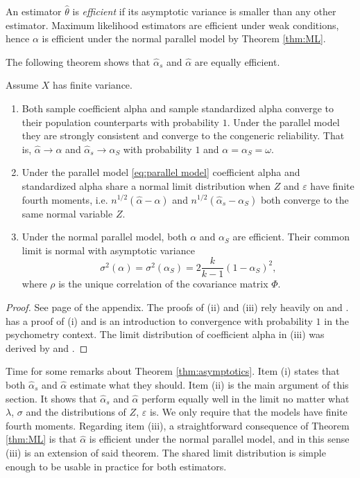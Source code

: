 \documentclass[twoside]{article}
\begin{document}
An estimator $\hat{\theta}$ is \textit{efficient} \citep[][Section 4.3]{Lehmann2004-ke} if its asymptotic variance is smaller than any other estimator. Maximum likelihood estimators are efficient under weak conditions, hence $\alpha$ is efficient under the normal parallel model by Theorem \ref{thm:ML}.  

The following theorem shows that $\hat{\alpha}_s$ and $\hat{\alpha}$ are equally efficient.

\begin{thm}
\label{thm:asymptotics}
Assume $X$ has finite variance. 
\begin{enumerate}[label=(\roman*)]
    \item Both sample coefficient alpha and sample standardized alpha converge to their population counterparts with probability $1$. Under the parallel model they are strongly consistent and converge to the congeneric reliability. That is, $\hat{\alpha}\to\alpha$ and $\hat{\alpha}_s\to\alpha_S$ with probability $1$ and $\alpha = \alpha_S = \omega$.
    \item Under the parallel model \eqref{eq:parallel model} coefficient alpha and standardized alpha share a normal limit distribution when $Z$ and $\varepsilon$ have finite fourth moments, i.e. $n^{1/2}(\hat{\alpha} - \alpha)$ and  $n^{1/2}(\hat{\alpha}_s - \alpha_S)$ both converge to the same normal variable $Z$.
    \item Under the normal parallel model, both $\alpha$ and $\alpha_S$ are efficient. Their common limit is normal with asymptotic variance 
    $$\sigma^{2}(\alpha)= \sigma^{2}(\alpha_S)=2\frac{k}{k-1}(1-\alpha_S)^{2},$$
    where $\rho$ is the unique correlation of the covariance matrix $\Phi$.
\end{enumerate}
\end{thm}    
\begin{proof}
See page \pageref{proof:asymptotics} of the appendix. The proofs of (ii) and (iii) rely heavily on \citep{Van_Zyl2000-si} and \citep{hayashi2005note}. \citep{Raykov2019-tv} has a proof of (i) and is an introduction to convergence with probability $1$ in the psychometry context. The limit distribution of coefficient alpha in (iii) was derived by \citet[][eq. 13]{Van_Zyl2000-si} and \citet[][eq. 58]{Kristof1963-tb}.
\end{proof}

Time for some remarks about Theorem \ref{thm:asymptotics}. Item (i) states that both $\hat{\alpha}_s$ and $\hat{\alpha}$ estimate what they should. Item (ii) is the main argument of this section. It shows that $\hat{\alpha}_{s}$ and $\hat{\alpha}$ perform equally well in the limit no matter what $\lambda$, $\sigma$ and the distributions of $Z$, $\varepsilon$ is. We only require that the models have finite fourth moments. Regarding item (iii), a straightforward consequence of Theorem \ref{thm:ML} is that $\hat{\alpha}$ is efficient under the normal parallel model, and in this sense (iii) is an extension of said theorem. The shared limit distribution is simple enough to be usable in practice for both estimators. 
\end{document}
